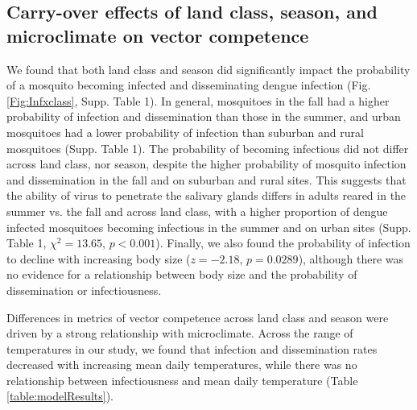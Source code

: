 \documentclass[12pt]{article}
\begin{document}
\subsection{Carry-over effects of land class, season, and microclimate on vector competence}

We found that both land class and season did significantly impact the probability of a mosquito becoming infected and disseminating dengue infection (Fig. \ref{Fig:Infxclass}, Supp. Table 1). In general, mosquitoes in the fall had a higher probability of infection and dissemination  than those in the summer, and urban mosquitoes had a lower probability of infection than suburban and rural mosquitoes (Supp. Table 1). The probability of becoming infectious did not differ across land class, nor season, despite the higher probability of mosquito infection and dissemination in the fall and on suburban and rural sites. This suggests that the ability of virus to penetrate the salivary glands differs in adults reared in the summer vs. the fall and across land class, with a higher proportion of dengue infected mosquitoes becoming infectious in the summer and on urban sites (Supp. Table 1, $\chi^2=13.65$, $p<0.001$). Finally, we also found the probability of infection to decline with increasing body size ($z=-2.18$, $p=0.0289$), although there was no evidence for a relationship between body size and the probability of dissemination or infectiousness. 

Differences in metrics of vector competence across land class and season were driven by a strong relationship with microclimate. Across the range of temperatures in our study, we found that infection and dissemination rates decreased with increasing mean daily temperatures, while there was no relationship between infectiousness and mean daily temperature (Table \ref{table:modelResults}).
\end{document}
